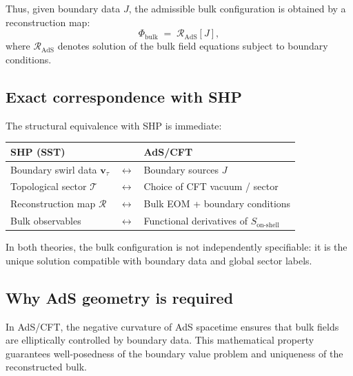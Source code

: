 \documentclass[11pt]{article}
\begin{document}
        Thus, given boundary data $J$, the admissible bulk configuration is obtained by a
        reconstruction map:
        \begin{equation}
            \Phi_{\mathrm{bulk}}
            \;=\;
            \mathcal{R}_{\mathrm{AdS}}[J],
        \end{equation}
        where $\mathcal{R}_{\mathrm{AdS}}$ denotes solution of the bulk field equations
        subject to boundary conditions.

    \subsection{Exact correspondence with SHP}

        The structural equivalence with SHP is immediate:

        \begin{center}
            \begin{tabular}{lll}
                \toprule
                \textbf{SHP (SST)} & & \textbf{AdS/CFT} \\
                \midrule
                Boundary swirl data $\mathbf{v}_\tau$ & $\longleftrightarrow$ & Boundary sources $J$ \\[6pt]

                Topological sector $\mathcal{T}$ & $\longleftrightarrow$ & Choice of CFT vacuum / sector \\[6pt]

                Reconstruction map $\mathcal{R}$ & $\longleftrightarrow$ & Bulk EOM + boundary conditions \\[6pt]

                Bulk observables & $\longleftrightarrow$ & Functional derivatives of $S_{\text{on-shell}}$ \\[6pt]
                \bottomrule
            \end{tabular}
        \end{center}

        In both theories, the bulk configuration is not independently specifiable: it is
        the unique solution compatible with boundary data and global sector labels.

    \subsection{Why AdS geometry is required}

        In AdS/CFT, the negative curvature of AdS spacetime ensures that bulk fields are
        elliptically controlled by boundary data. This mathematical property guarantees
        well-posedness of the boundary value problem and uniqueness of the reconstructed
        bulk.
\end{document}
